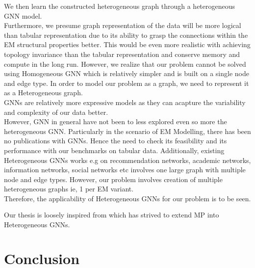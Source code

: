 \documentclass{report} %
\begin{document}
We then learn the constructed heterogeneous graph through a heterogeneous \ac{GNN} model.\\   

Furthermore, we presume graph representation of the data will be more logical than tabular representation due to its ability to grasp the connections within the \ac{EM} structural properties better.
This would be even more realistic with achieving topology invariance than the tabular representation and conserve memory and compute in the long run.
However, we realize that our problem cannot be solved using Homogeneous \ac{GNN} which is relatively simpler and is built on a single node and edge type.
In order to model our problem as a graph, we need to represent it as a Heterogeneous graph. \\

\ac{GNN}s are relatively more expressive models as they can acapture the variability and complexity of our data better.\\
However, \ac{GNN} in general have not been to less explored even so more the heterogeneous \ac{GNN}.
Particularly in the scenario of \ac{EM} Modelling, there has been no publications with \ac{GNN}s.
Hence the need to check its feasibility and its performance with our benchmarks on tabular data.
Additionally, existing Heterogeneous \ac{GNN}s works e.g on recommendation networks, academic networks, information networks, social networks etc involves one large graph with multiple node and edge types. 
However, our problem involves creation of multiple heterogeneous graphs ie, 1 per \ac{EM} variant.\\
Therefore, the applicability of Heterogeneous \ac{GNN}s for our problem is to be seen.

Our thesis is loosely inspired from \cite{ML HGNN-2023} which has strived to extend \ac{MP} into Heterogeneous \ac{GNN}s.\\

\newpage 

\chapter{Conclusion}
\end{document}
